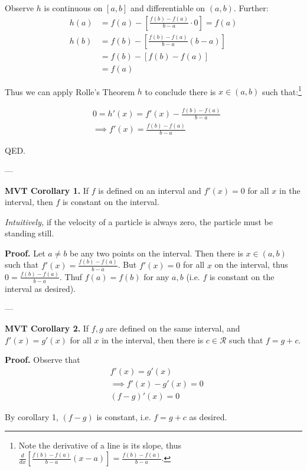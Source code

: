 Observe $h$ is continuous on $[a,b]$ and differentiable on $(a,b)$.
Further:
\begin{align*}
  h(a)&=f(a)-\left[\frac{f(b)-f(a)}{b-a}\cdot0\right]=f(a)\\
  h(b)&=f(b)-\left[\frac{f(b)-f(a)}{b-a}(b-a)\right]\\
      &=f(b)-[f(b)-f(a)]\\
      &=f(a)
\end{align*}

Thus we can apply Rolle's Theorem $h$ to conclude there is $x\in(a,b)$
such that:\footnote{Note the derivative of a line is its slope, thus
  $\frac{d}{dx}\left[\frac{f(b)-f(a)}{b-a}(x-a)\right]=\frac{f(b)-f(a)}{b-a}$.}

\begin{align*}
  &0=h'(x)=f'(x)-\frac{f(b)-f(a)}{b-a}\\
  &\implies f'(x)=\frac{f(b)-f(a)}{b-a}
\end{align*}

QED.

\vs---\vs

\textbf{MVT Corollary 1.} If $f$ is defined on an interval and $f'(x)=0$
for all $x$ in the interval, then $f$ is constant on the interval.

\vs

\textit{Intuitively,} if the velocity of a particle is always zero,
the particle must be standing still.

\vs

\textbf{Proof.} Let $a\neq b$ be any two points on the interval. Then
there is $x\in(a,b)$ such that $f'(x)=\frac{f(b)-f(a)}{b-a}$. But
$f'(x)=0$ for all $x$ on the interval, thus $0=\frac{f(b)-f(a)}{b-a}$.
Thuf $f(a)=f(b)$ for any $a,b$ (i.e. $f$ is constant on the interval
as desired).

\vs---\vs

\textbf{MVT Corollary 2.} If $f,g$ are defined on the same interval, and
$f'(x)=g'(x)$ for all $x$ in the interval, then there is
$c\in\mathcal{R}$ such that $f=g+c$.

\vs

\textbf{Proof.} Observe that
\begin{align*}
  &f'(x)=g'(x)\\
  &\implies f'(x)-g'(x)=0\\
  &(f-g)'(x)=0
\end{align*}

By corollary 1, $(f-g)$ is constant, i.e. $f=g+c$ as desired.

